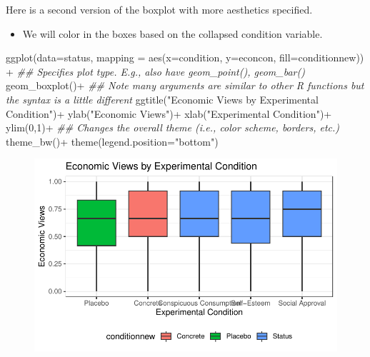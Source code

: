 \documentclass[
  letterpaper,
  DIV=11,
  numbers=noendperiod]{scrreprt}
\newenvironment{Shaded}{\begin{snugshade}}{\end{snugshade}}
\newcommand{\AttributeTok}[1]{\textcolor[rgb]{0.40,0.45,0.13}{#1}}
\newcommand{\DecValTok}[1]{\textcolor[rgb]{0.68,0.00,0.00}{#1}}
\newcommand{\DocumentationTok}[1]{\textcolor[rgb]{0.37,0.37,0.37}{\textit{#1}}}
\newcommand{\FunctionTok}[1]{\textcolor[rgb]{0.28,0.35,0.67}{#1}}
\newcommand{\NormalTok}[1]{\textcolor[rgb]{0.00,0.23,0.31}{#1}}
\newcommand{\SpecialCharTok}[1]{\textcolor[rgb]{0.37,0.37,0.37}{#1}}
\newcommand{\StringTok}[1]{\textcolor[rgb]{0.13,0.47,0.30}{#1}}
\providecommand{\tightlist}{%
  \setlength{\itemsep}{0pt}\setlength{\parskip}{0pt}}\usepackage{longtable,booktabs,array}
\begin{document}
Here is a second version of the boxplot with more aesthetics specified.

\begin{itemize}
\tightlist
\item
  We will color in the boxes based on the collapsed condition variable.
\end{itemize}

\begin{Shaded}
\begin{Highlighting}[]
\FunctionTok{ggplot}\NormalTok{(}\AttributeTok{data=}\NormalTok{status, }\AttributeTok{mapping =} \FunctionTok{aes}\NormalTok{(}\AttributeTok{x=}\NormalTok{condition, }\AttributeTok{y=}\NormalTok{econcon, }\AttributeTok{fill=}\NormalTok{conditionnew)) }\SpecialCharTok{+}
  \DocumentationTok{\#\# Specifies plot type. E.g., also have geom\_point(), geom\_bar()}
  \FunctionTok{geom\_boxplot}\NormalTok{()}\SpecialCharTok{+}
  \DocumentationTok{\#\# Note many arguments are similar to other R functions but the syntax is a little different}
  \FunctionTok{ggtitle}\NormalTok{(}\StringTok{"Economic Views by Experimental Condition"}\NormalTok{)}\SpecialCharTok{+}
  \FunctionTok{ylab}\NormalTok{(}\StringTok{"Economic Views"}\NormalTok{)}\SpecialCharTok{+}
  \FunctionTok{xlab}\NormalTok{(}\StringTok{"Experimental Condition"}\NormalTok{)}\SpecialCharTok{+}
  \FunctionTok{ylim}\NormalTok{(}\DecValTok{0}\NormalTok{,}\DecValTok{1}\NormalTok{)}\SpecialCharTok{+}
  \DocumentationTok{\#\# Changes the overall theme (i.e., color scheme, borders, etc.)}
  \FunctionTok{theme\_bw}\NormalTok{()}\SpecialCharTok{+}
  \FunctionTok{theme}\NormalTok{(}\AttributeTok{legend.position=}\StringTok{"bottom"}\NormalTok{)}
\end{Highlighting}
\end{Shaded}

\begin{figure}[H]

{\centering \includegraphics{04-Visualization_files/figure-pdf/unnamed-chunk-47-1.pdf}

}

\end{figure}
\end{document}
